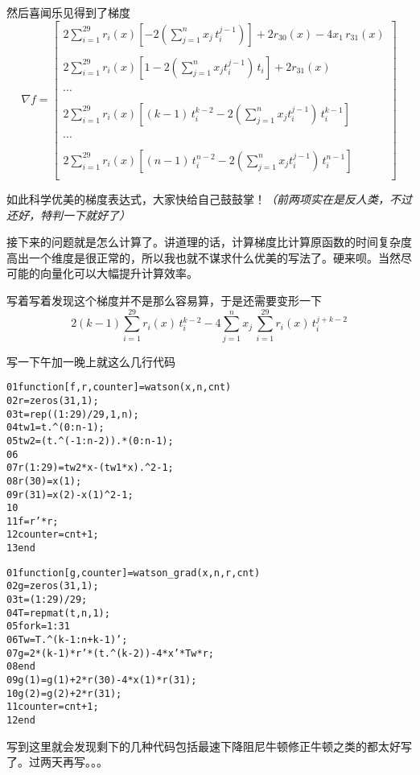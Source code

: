 \documentclass[a4paper, 11pt]{article}
\begin{document}
然后喜闻乐见得到了梯度
\begin{equation}
\nabla f= 
\begin{bmatrix}
2\sum_{i=1}^{29}r_i(x)\left[-2\left(\sum_{j=1}^nx_j\,t_i^{j-1}\right)\right]+2r_{30}(x)-4x_1\,r_{31}(x)\\\\
2\sum_{i=1}^{29}r_i(x)\left[1-2\left(\sum_{j=1}^nx_jt_i^{j-1}\right)\,t_i\right]+2r_{31}(x)\\\\
\cdots\\\\
2\sum_{i=1}^{29}r_i(x)\left[(k-1)\,t_i^{k-2}-2\left(\sum_{j=1}^nx_jt_i^{j-1}\right)\,t_i^{k-1}\right]\\\\
\cdots\\\\
2\sum_{i=1}^{29}r_i(x)\left[(n-1)\,t_i^{n-2}-2\left(\sum_{j=1}^nx_jt_i^{j-1}\right)\,t_i^{n-1}\right]\\
\end{bmatrix}
\end{equation}

如此科学优美的梯度表达式，大家快给自己鼓鼓掌！\textsl{（前两项实在是反人类，不过还好，特判一下就好了）}

接下来的问题就是怎么计算了。讲道理的话，计算梯度比计算原函数的时间复杂度高出一个维度是很正常的，所以我也就不谋求什么优美的写法了。硬来呗。当然尽可能的向量化可以大幅提升计算效率。

写着写着发现这个梯度并不是那么容易算，于是还需要变形一下
\[2(k-1)\sum_{i=1}^{29}r_i(x)\,t_i^{k-2}-4\sum_{j=1}^nx_j\,\sum_{i=1}^{29}r_i(x)\,t_i^{j+k-2}\]

写一下午加一晚上就这么几行代码

\begin{alltt}
01 \textcolor{keyword}{function} [f, r, counter] = watson(x, n, cnt)
02     r = zeros(31, 1);
03     t = rep((1:29) / 29, 1, n);
04     tw1 = t .\^{} (0:n-1);
05     tw2 = (t .\^{} (-1:n-2)) .* (0:n-1);
06     
07     r(1:29) = tw2 * x - (tw1 * x) .\^{} 2 - 1;
08     r(30) = x(1);
09     r(31) = x(2) - x(1) \^{} 2 - 1;
10     
11     f = r' * r;
12     counter = cnt + 1;
13 \textcolor{keyword}{end}
\end{alltt}

\begin{alltt}
01 \textcolor{keyword}{function} [g, counter] = watson\_grad(x, n, r, cnt)
02     g = zeros(31, 1);
03     t = (1:29) / 29;
04     T = repmat(t, n, 1);
05     \textcolor{keyword}{for} k = 1:31
06         Tw = T .\^{} (k-1:n+k-1)';
07         g = 2 * (k - 1) * r' * (t .\^{} (k - 2)) - 4 * x' * Tw * r;
08     \textcolor{keyword}{end}
09     g(1) = g(1) + 2 * r(30) - 4 * x(1) * r(31);
10     g(2) = g(2) + 2 * r(31);
11     counter = cnt + 1;
12 \textcolor{keyword}{end}
\end{alltt}

写到这里就会发现剩下的几种代码包括最速下降阻尼牛顿修正牛顿之类的都太好写了。过两天再写。。。

\newpage


\end{document}
